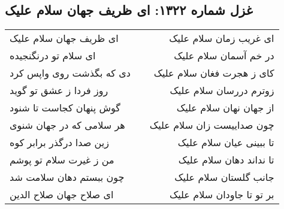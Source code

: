 \begin{center}
\section*{غزل شماره ۱۳۲۲: ای ظریف جهان سلام علیک}
\label{sec:1322}
\begin{longtable}{l p{0.5cm} r}
ای ظریف جهان سلام علیک
&&
ای غریب زمان سلام علیک
\\
ای سلام تو درنگنجیده
&&
در خم آسمان سلام علیک
\\
دی که بگذشت روی واپس کرد
&&
کای ز هجرت فغان سلام علیک
\\
روز فردا ز عشق تو گوید
&&
زوترم دررسان سلام علیک
\\
گوش پنهان کجاست تا شنود
&&
از جهان نهان سلام علیک
\\
هر سلامی که در جهان شنوی
&&
چون صداییست زان سلام علیک
\\
زین صدا درگذر برابر کوه
&&
تا ببینی عیان سلام علیک
\\
من ز غیرت سلام تو پوشم
&&
تا نداند دهان سلام علیک
\\
چون ببستم دهان سلامت شد
&&
جانب گلستان سلام علیک
\\
ای صلاح جهان صلاح الدین
&&
بر تو تا جاودان سلام علیک
\\
\end{longtable}
\end{center}
